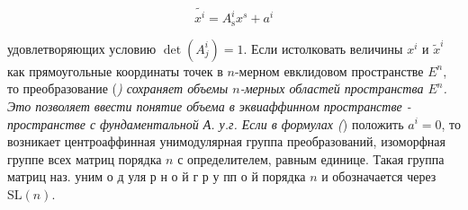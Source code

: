 \documentclass[10pt]{article}
\begin{document}
\[

\tilde{x^{i}}=A_{\mathrm{s}}^{i} x^{s}+a^{i}

\]



удовлетворяющих условию $\operatorname{det}\left(A_{j}^{i}\right)=1$. Если истолковать величины $x^{i}$ и $\tilde{x}^{i}$ как прямоугольные координаты точек в $n$-мерном евклидовом пространстве $E^{n}$, то преобразование (\textit{) сохраняет объемы $n$-мерных областей пространства $E^{n}$. Это позволяет ввести понятие объема в эквиаффинном пространстве - пространстве с фундаментальной А. у.г. Если в формулах (}) положить $a^{i}=0$, то возникает центроаффинная унимодулярная группа преобразований, изоморфная группе всех матриц порядка $n$ с определителем, равным единице. Такая группа матриц наз. уним о д уля р н о й г р у пп о й порядка $n$ и обозначается через $\mathrm{SL}(n)$.
\end{document}
